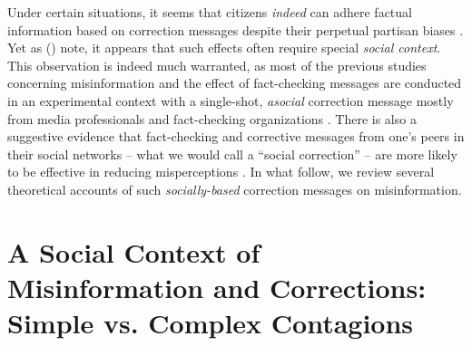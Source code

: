 \documentclass[man, 12pt, a4paper, nolmodern, noextraspace]{apa6}
\begin{document}
  Under certain situations, it seems that citizens \emph{indeed} can adhere factual information based on correction messages despite their perpetual partisan biases \parencite[e.g.,][]{Wood2018, nyhan2017taking}. Yet as \citeauthor{margolin2017} (\citeyear{margolin2017}) note, it appears that such effects often require special \emph{social context}. This observation is indeed much warranted, as most of the previous studies concerning misinformation and the effect of fact-checking messages are conducted in an experimental context with a single-shot, \emph{asocial} correction message mostly from media professionals and fact-checking organizations \parencite[e.g.,][]{nyhan2010corrections,garrett2013undermining,weeks2015emotions}. There is also a suggestive evidence that fact-checking and corrective messages from one's peers in their social networks -- what we would call a \enquote{social correction} -- are more likely to be effective in reducing misperceptions \parencite[e.g.,][]{margolin2017, bode2017see}. In what follow, we review several theoretical accounts of such \emph{socially-based} correction messages on misinformation.   
      
\section{A Social Context of Misinformation and Corrections: Simple vs. Complex Contagions}
\end{document}
